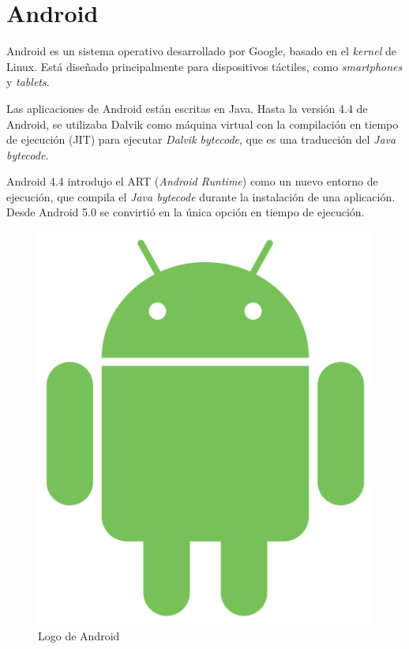 
\section{Android}

\label{Android}

Android es un sistema operativo desarrollado por Google, basado en el \emph{kernel} de Linux. Está diseñado principalmente para dispositivos táctiles, como \emph{smartphones} y \emph{tablets}.

Las aplicaciones de Android están escritas en Java. Hasta la versión 4.4 de Android, se utilizaba Dalvik como máquina virtual con la compilación en tiempo de ejecución (JIT) para ejecutar \emph{Dalvik bytecode}, que es una traducción del \emph{Java bytecode}.

Android 4.4 introdujo el ART (\emph{Android Runtime}) como un nuevo entorno de ejecución, que compila el \emph{Java bytecode} durante la instalación de una aplicación. Desde Android 5.0 se convirtió en la única opción en tiempo de ejecución. \emph{\parencite{Reference7}}

\begin{figure}[ht]
  \centering
  \includegraphics[scale=0.1]{Figures/AndroidLogo}
  \decoRule
  \caption[Android (Logo)]{Logo de Android \emph{\parencite{Reference3}}}
  \label{fig:AndroidLogo}
\end{figure}

